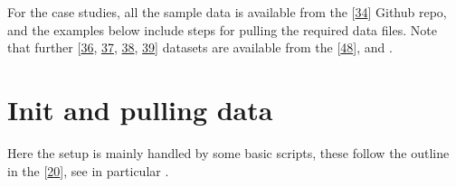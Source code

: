 \documentclass[letterpaper,table,10pt,english]{jupyterBook}
\begin{document}
\sphinxAtStartPar
For the case studies, all the sample data is available from the  {[}\hyperlink{cite.backmatter/bibliography:id607}{34}{]} Github repo, and the examples below include steps for pulling the required data files. Note that further  {[}\hyperlink{cite.backmatter/bibliography:id763}{36}, \hyperlink{cite.backmatter/bibliography:id627}{37}, \hyperlink{cite.backmatter/bibliography:id804}{38}, \hyperlink{cite.backmatter/bibliography:id766}{39}{]} datasets are available from the  {[}\hyperlink{cite.backmatter/bibliography:id678}{48}{]}, and .


\section{Init and pulling data}
\label{\detokenize{part2/basic_fitting_numerics_intro_260723:init-and-pulling-data}}
\sphinxAtStartPar
Here the setup is mainly handled by some basic scripts, these follow the outline in the  {[}\hyperlink{cite.backmatter/bibliography:id680}{20}{]}, see in particular .
\end{document}
